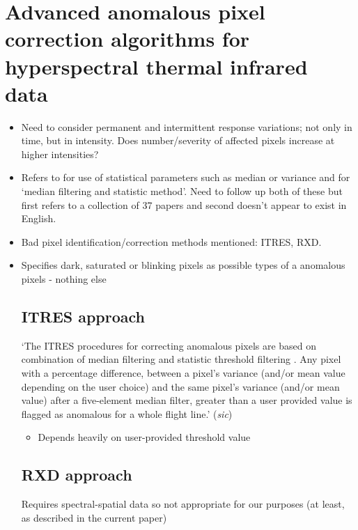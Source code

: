 \documentclass[10pt,fleqn]{article}
\begin{document}
\section{Advanced anomalous pixel correction algorithms for hyperspectral thermal infrared data \cite{Santini2014}}

\begin{itemize}

\item
Need to consider permanent and intermittent response variations; not only in time, but in intensity. Does number/severity of affected pixels increase at higher intensities?

\item
Refers to \cite{Cracknell2013} for use of statistical parameters such as median or variance and \cite{Liu2009} for `median filtering and statistic method'. Need to follow up both of these but first refers to a collection of 37 papers and second doesn't appear to exist in English.

\item
Bad pixel identification/correction methods mentioned: ITRES, RXD.

\item
Specifies dark, saturated or blinking pixels as possible types of a anomalous pixels - nothing else

\subsection{ITRES approach}
`The ITRES procedures for correcting anomalous pixels are based on combination of median filtering and statistic threshold filtering \cite{Cracknell2013}. Any pixel with a percentage difference, between a pixel's variance (and/or mean value depending on the user choice) and the same pixel's variance (and/or mean value) after a five-element median filter, greater than a user provided value is flagged as anomalous for a whole flight line.' (\textit{sic})

\begin{itemize}
\item
Depends heavily on user-provided threshold value
\end{itemize}

\subsection{RXD approach}
Requires spectral-spatial data so not appropriate for our purposes (at least, as described in the current paper)


\end{itemize}
\end{document}
